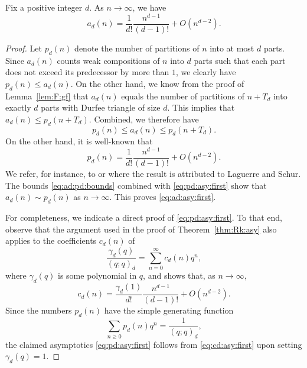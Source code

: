 \documentclass[11pt]{article}
\theoremstyle{plain}
\theoremstyle{definition}
\newcommand{\rightarrowlim}{\mathop{\rightarrow}\limits}
\begin{document}
\begin{lemma}
  Fix a positive integer $d$. As $n \rightarrowlim \infty$, we have
  \begin{equation}
    a_d (n) = \frac{1}{d!} \frac{n^{d - 1}}{(d - 1) !} + O (n^{d - 2}) .
    \label{eq:ad:asy:first}
  \end{equation}
\end{lemma}

\begin{proof}
  Let $p_d (n)$ denote the number of partitions of $n$ into at most $d$ parts.
  Since $a_d (n)$ counts weak compositions of $n$ into $d$ parts such that
  each part does not exceed its predecessor by more than $1$, we clearly have
  $p_d (n) \leq a_d (n)$. On the other hand, we know from the proof of
  Lemma~\ref{lem:F:gf} that $a_d (n)$ equals the number of partitions of $n +
  T_d$ into exactly $d$ parts with Durfee triangle of size $d$. This implies
  that $a_d (n) \leq p_d (n + T_d)$. Combined, we therefore have
  \begin{equation}
    p_d (n) \leq a_d (n) \leq p_d (n + T_d) .
    \label{eq:ad:pd:bounds}
  \end{equation}
  On the other hand, it is well-known that
  \begin{equation}
    p_d (n) = \frac{1}{d!} \frac{n^{d - 1}}{(d - 1) !} + O (n^{d - 2}) .
    \label{eq:pd:asy:first}
  \end{equation}
  We refer, for instance, to \cite[Part~1, Problem~27]{polya-szego-1} or
  \cite[Theorem~4.2.1]{ramirez-alfonsin-frobenius} where the result is
  attributed to Laguerre and Schur. The bounds \eqref{eq:ad:pd:bounds}
  combined with \eqref{eq:pd:asy:first} show that $a_d (n) \sim p_d (n)$ as $n
  \rightarrow \infty$. This proves \eqref{eq:ad:asy:first}.
  
  For completeness, we indicate a direct proof of \eqref{eq:pd:asy:first}. To
  that end, observe that the argument used in the proof of
  Theorem~\ref{thm:Rk:asy} also applies to the coefficients $c_d (n)$ of
  \begin{equation*}
    \frac{\gamma_d (q)}{(q ; q)_d} = \sum_{n = 0}^{\infty} c_d (n) q^n,
  \end{equation*}
  where $\gamma_d (q)$ is some polynomial in $q$, and shows that, as $n
  \rightarrow \infty$,
  \begin{equation}
    c_d (n) = \frac{\gamma_d (1)}{d!} \frac{n^{d - 1}}{(d - 1) !} + O (n^{d -
    2}) . \label{eq:cd:asy:first}
  \end{equation}
  Since the numbers $p_d (n)$ have the simple generating function
  \begin{equation}
    \sum_{n \geq 0} p_d (n) q^n = \frac{1}{(q ; q)_d}, \label{eq:pd:gf}
  \end{equation}
  the claimed asymptotics \eqref{eq:pd:asy:first} follows from
  \eqref{eq:cd:asy:first} upon setting $\gamma_d (q) = 1$.
\end{proof}
\end{document}
